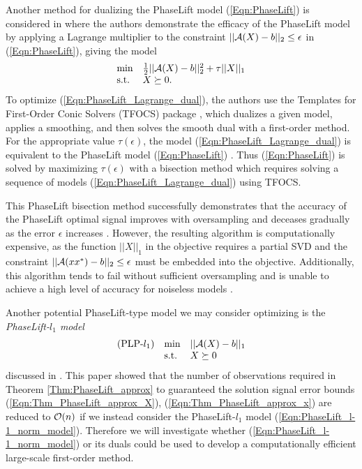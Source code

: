Another method for dualizing the PhaseLift model (\ref{Eqn:PhaseLift}) is considered in \cite{candes2013phaselift} where the authors demonstrate the efficacy of the PhaseLift model by applying a Lagrange multiplier to the constraint $||{\mathcal A}(X)-b||_2 \leq \epsilon$ in (\ref{Eqn:PhaseLift}), giving the model
\begin{equation}		\label{Eqn:PhaseLift_Lagrange_dual}
\begin{array}{ll}
	\min
		& \frac{1}{2}||{\mathcal A}(X) - b||_2^2 +\tau ||X||_1
			\\
	\textnormal{s.t.}
		&	X \succeq 0.
\end{array}
\end{equation}
To optimize (\ref{Eqn:PhaseLift_Lagrange_dual}), the authors use the Templates for First-Order Conic Solvers (TFOCS) package \cite{becker2011templates}, which dualizes a given model, applies a smoothing, and then solves the smooth dual with a first-order method.  
For the appropriate value $ \tau(\epsilon)$, the model (\ref{Eqn:PhaseLift_Lagrange_dual})  is equivalent to the PhaseLift model (\ref{Eqn:PhaseLift}) \cite[Section 28]{rockafellar1970convex}.  
Thus (\ref{Eqn:PhaseLift}) is solved by maximizing $\tau(\epsilon)$ with a bisection method which requires solving a sequence of models (\ref{Eqn:PhaseLift_Lagrange_dual}) using TFOCS.


This PhaseLift bisection method successfully demonstrates that the accuracy of the PhaseLift optimal signal improves with oversampling and deceases gradually as the error $\epsilon$ increases \cite[Section 7]{candes2013phaselift}.  
However, the resulting algorithm is computationally expensive, as the function $||X||_1$ in the objective requires a partial SVD and the constraint $||{\mathcal A}(xx^*) - b||_2 \leq \epsilon$ must be embedded into the objective.  
Additionally, this algorithm tends to fail without sufficient oversampling and is unable to achieve a high level of accuracy for noiseless models \cite[Section 5, Table 1]{DBLP:journals/siamsc/FriedlanderM16}.


Another potential PhaseLift-type model we may consider optimizing is the \textit{PhaseLift-$l_1$ model}
\begin{equation} 			\label{Eqn:PhaseLift_l-1_norm_model}
\begin{array}{lll}
(\textnormal{PLP-}l_1)	
&	\min
		& ||{\mathcal A}(X) - b||_1
			\\
&	\textnormal{s.t.}
		&	X \succeq 0
\end{array}
\end{equation}
discussed in \cite{candes2014solving}.  
This paper showed that the number of observations required in Theorem \ref{Thm:PhaseLift_approx} to guaranteed the solution signal error bounds (\ref{Eqn:Thm_PhaseLift_approx_X}), (\ref{Eqn:Thm_PhaseLift_approx_x}) are reduced to ${\mathcal O}(n)$ if we instead consider the PhaseLift-$l_1$ model (\ref{Eqn:PhaseLift_l-1_norm_model}).
Therefore we will investigate whether (\ref{Eqn:PhaseLift_l-1_norm_model}) or its duals could be used to develop a computationally efficient large-scale first-order method.


